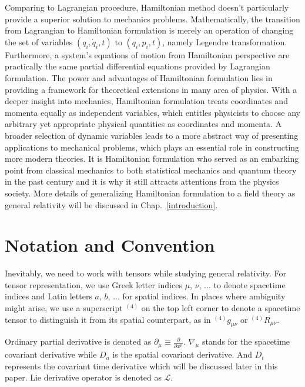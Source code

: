 Comparing to Lagrangian procedure, Hamiltonian method doesn't particularly provide a superior solution to mechanics problems. Mathematically, the transition from Lagrangian to Hamiltonian formulation is merely an operation of changing the set of variables $(q_{i}, {\dot q}_{i}, t)$ to $(q_{i}, p_{i}, t)$, namely Legendre transformation. Furthermore, a system's equations of motion from Hamiltonian perspective are practically the same partial differential equations provided by Lagrangian formulation. The power and advantages of Hamiltonian formulation lies in providing a framework for theoretical extensions in many area of physics. With a deeper insight into mechanics, Hamiltonian formulation treats coordinates and momenta equally as independent variables, which entitles physicists to choose any arbitrary yet appropriate physical quantities as coordinates and momenta. A broader selection of dynamic variables leads to a more abstract way of presenting applications to mechanical problems, which plays an essential role in constructing more modern theories. It is Hamiltonian formulation who served as an embarking point from classical mechanics to both statistical mechanics and quantum theory in the past century and it is why it still attracts attentions from the physics society\cite{goldstein}. More details of generalizing Hamiltonian formulation to a field theory as general relativity will be discussed in Chap.~\ref{introduction}. 

\section{Notation and Convention}\label{notation} Inevitably, we need to work with tensors while studying general relativity. For tensor representation, we use Greek letter indices $\mu$, $\nu$, ... to denote spacetime indices and Latin letters $a$, $b$, ... for spatial indices. In places where ambiguity might arise, we use a superscript $^{(4)}$ on the top left corner to denote a spacetime tensor to distinguish it from its spatial counterpart, as in $^{(4)}g_{\mu\nu}$ or $^{(4)}R_{\mu\nu}$.  

Ordinary partial derivative is denoted as $
\partial_{\mu} \equiv \frac{
\partial}{
\partial x^{\mu}}$. $\nabla_{\mu}$ stands for the spacetime covariant derivative while $D_{a}$ is the spatial covariant derivative. And $D_{t}$ represents the covariant time derivative which will be discussed later in this paper. Lie derivative operator is denoted as $\mathcal{L}$. 

